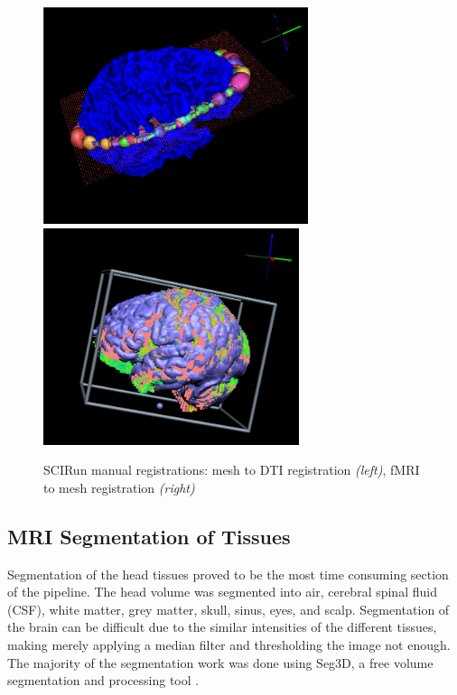 \begin{figure}[H]
\begin{center}
\includegraphics[height = 2.5in]{Figures/DTI_reg}
\includegraphics[height = 2.5in]{Figures/fmri_reg}
\caption{SCIRun manual registrations: mesh to DTI registration \textit{(left)}, fMRI to mesh registration \textit{(right)}}
\label{fig:dtireg}
\end{center}
\end{figure}

\subsection{MRI Segmentation of Tissues}
\label{sec:Seg}


Segmentation of the head tissues proved to be the most time consuming section of the pipeline. The head volume was segmented into air, cerebral spinal fluid (CSF), white matter, grey matter, skull, sinus, eyes, and scalp. Segmentation of the brain can be difficult due to the similar intensities of the different tissues, making merely applying a median filter and thresholding the image not enough. The majority of the segmentation work was done using Seg3D, a free volume segmentation and processing tool \cite{ref:seg3d}.

